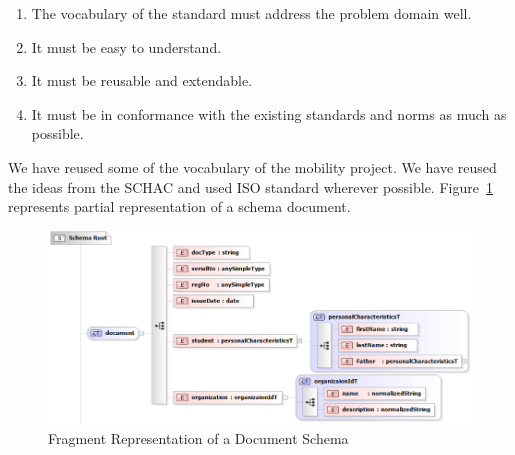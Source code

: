 \documentclass[12pt,a4paper,oneside]{book}
\begin{document}
\begin{enumerate}
\item The vocabulary of the standard must address the problem domain well.
\item It must be easy to understand.
\item It must be reusable and extendable.
\item It must be in conformance with the existing standards and norms as much as possible.
\end{enumerate}

We have reused some of the vocabulary of the mobility project\cite{The Mobility Project}. We have reused the ideas from the SCHAC \cite{SCHAC 1.5.0} and  used ISO standard wherever possible. Figure~\ref{fig:schema_document} represents partial representation of a schema document. 

\begin{figure}[!htp]
  \centering
  \includegraphics[width=14cm]{schema_document.png}
  \caption{Fragment Representation of a Document Schema}
  \label{fig:schema_document}
\end{figure}
\end{document}
